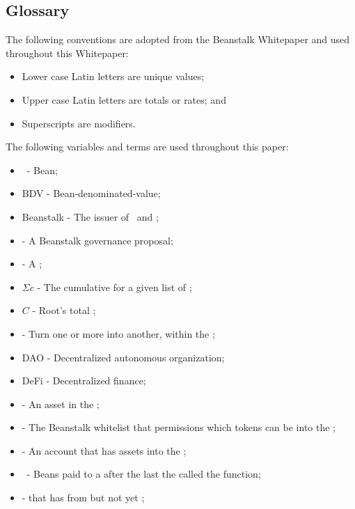 \documentclass[class=article, crop=false]{standalone}
\begin{document}
\subsection{Glossary}
The following conventions are adopted from the Beanstalk Whitepaper and used throughout this Whitepaper:
\begin{itemize}
    \item Lower case Latin letters are unique values;
    \item Upper case Latin letters are totals or rates; and
    \item Superscripts are modifiers.
\end{itemize}

The following variables and terms are used throughout this paper:
\begin{itemize}[topsep=0pt, itemsep=3pt,leftmargin=16pt]
    \item[] \Bean\ - Bean;
    \item[] BDV - Bean-denominated-value;
    \item[] Beanstalk - The issuer of \Bean\ and  ; 
    \item[]  - A Beanstalk governance proposal;
    \item[]  - A ;
    \item[] $\Sigma c$ - The cumulative  for a given list of  ;
    \item[] $C$ - Root's total ;
    \item[]  - Turn one or more   into another, within the ;
    \item[] DAO - Decentralized autonomous organization;
    \item[] DeFi - Decentralized finance;
    \item[]  - An asset in the ;
    \item[]   - The Beanstalk whitelist that permissions which tokens can be  into the ;
    \item[]  - An account that has  assets into the ;
    \item[]  \Bean\ - Beans paid to a  after the last  the  called the  function;
    \item[]   -  that has  from  but not yet ;

\end{itemize}
\end{document}
